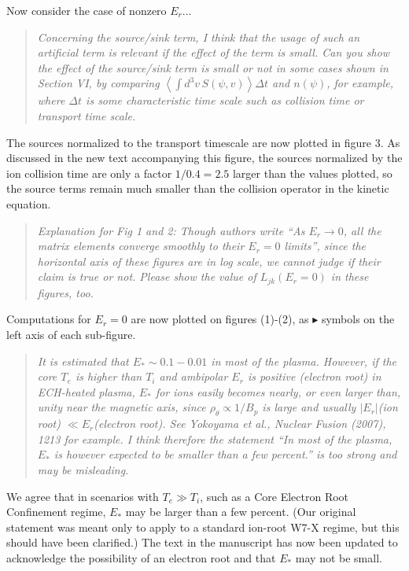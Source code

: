 \documentclass[11pt]{article}
\newcommand{\todo}[1]{{\color{red}#1}}
\newenvironment{referee}{\begin{quote}\it\color{Blue}}{\end{quote}}
\begin{document}
\todo{Now consider the case of nonzero $E_r$...}

\begin{referee}
Concerning the source/sink term, I think that the usage of such an artificial term is relevant if
the effect of the term is small. Can you show the effect of the source/sink term is small or not in
some cases shown in Section VI, by comparing $\left< \int d^3v\, S(\psi,v) \right> \Delta t$ and $n(\psi)$, for example, where
$\Delta t$ is some characteristic time scale such as collision time or transport time scale.
\end{referee}

The sources normalized to the transport timescale are now plotted in figure 3.
As discussed in the new text accompanying this figure, 
the sources normalized by the ion collision time are only a factor $1/0.4=2.5$ larger than the values plotted,
so the source terms remain much smaller than the collision operator in the kinetic equation.

\begin{referee}
Explanation for Fig 1 and 2: Though authors write ``As $E_r \to 0$, all the matrix elements converge
smoothly to their $E_r = 0$ limits'', since the horizontal axis of these figures are in log scale, we
cannot judge if their claim is true or not. Please show the value of $L_{jk}(E_r=0)$ in these figures,
too.
\end{referee}

Computations for $E_r=0$ are now plotted on figures (1)-(2), as $\blacktriangleright$ symbols on the left axis
of each sub-figure.

\begin{referee}
It is estimated that $E_* \sim 0.1 - 0.01$ in most of the plasma. However, if the core $T_e$ is higher than
$T_i$ and ambipolar $E_r$ is positive (electron root) in ECH-heated plasma, $E_*$ for ions easily becomes
nearly, or even larger than, unity near the magnetic axis, since $\rho_\theta \propto 1/B_p$ is large and usually
$|E_r|$(ion root) $\ll E_r$(electron root). See Yokoyama et al., Nuclear Fusion (2007), 1213 for example.
I think therefore the statement ``In most of the plasma, $E_*$ is however expected to be smaller
than a few percent.'' is too strong and may be misleading.
\end{referee}

We agree that in scenarios with $T_e \gg T_i$, such as a Core Electron Root Confinement regime,
$E_*$ may be larger than a few percent. (Our original statement
was meant only to apply to a standard ion-root W7-X regime,
but this should have been clarified.) The text in the manuscript has now been updated to acknowledge
the possibility of an electron root and that $E_*$ may not be small. 
\end{document}
